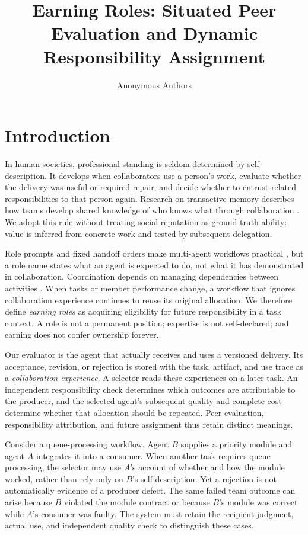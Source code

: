 \documentclass[sigconf,anonymous]{aamas}
\title[Earning Roles]{Earning Roles: Situated Peer Evaluation and Dynamic Responsibility Assignment}
\author{Anonymous Authors}
\affiliation{\institution{Anonymous Institution}}
\begin{document}
\maketitle

\section{Introduction}
In human societies, professional standing is seldom determined by self-description. It develops when collaborators use a person's work, evaluate whether the delivery was useful or required repair, and decide whether to entrust related responsibilities to that person again. Research on transactive memory describes how teams develop shared knowledge of who knows what through collaboration \cite{wegner1987transactive,lewis2003transactive}. We adopt this rule without treating social reputation as ground-truth ability: value is inferred from concrete work and tested by subsequent delegation.

Role prompts and fixed handoff orders make multi-agent workflows practical \cite{metagpt2024,wu2023autogen}, but a role name states what an agent is expected to do, not what it has demonstrated in collaboration. Coordination depends on managing dependencies between activities \cite{malone1994coordination}. When tasks or member performance change, a workflow that ignores collaboration experience continues to reuse its original allocation. We therefore define \emph{earning roles} as acquiring eligibility for future responsibility in a task context. A role is not a permanent position; expertise is not self-declared; and earning does not confer ownership forever.

Our evaluator is the agent that actually receives and uses a versioned delivery. Its acceptance, revision, or rejection is stored with the task, artifact, and use trace as a \emph{collaboration experience}. A selector reads these experiences on a later task. An independent responsibility check determines which outcomes are attributable to the producer, and the selected agent's subsequent quality and complete cost determine whether that allocation should be repeated. Peer evaluation, responsibility attribution, and future assignment thus retain distinct meanings.

Consider a queue-processing workflow. Agent $B$ supplies a priority module and agent $A$ integrates it into a consumer. When another task requires queue processing, the selector may use $A$'s account of whether and how the module worked, rather than rely only on $B$'s self-description. Yet a rejection is not automatically evidence of a producer defect. The same failed team outcome can arise because $B$ violated the module contract or because $B$'s module was correct while $A$'s consumer was faulty. The system must retain the recipient judgment, actual use, and independent quality check to distinguish these cases.
\end{document}
